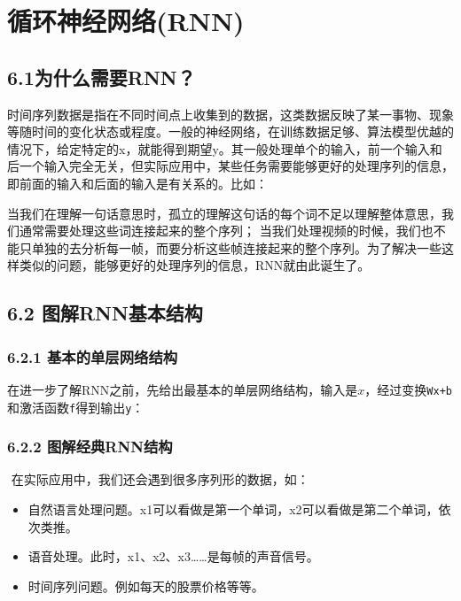 \chapter{循环神经网络(RNN)}\label{ux7b2cux516dux7ae0-ux5faaux73afux795eux7ecfux7f51ux7edcrnn}

\section{6.1为什么需要RNN？}\label{ux4e3aux4ec0ux4e48ux9700ux8981rnn}

​
时间序列数据是指在不同时间点上收集到的数据，这类数据反映了某一事物、现象等随时间的变化状态或程度。一般的神经网络，在训练数据足够、算法模型优越的情况下，给定特定的x，就能得到期望y。其一般处理单个的输入，前一个输入和后一个输入完全无关，但实际应用中，某些任务需要能够更好的处理序列的信息，即前面的输入和后面的输入是有关系的。比如：

​
当我们在理解一句话意思时，孤立的理解这句话的每个词不足以理解整体意思，我们通常需要处理这些词连接起来的整个序列；
当我们处理视频的时候，我们也不能只单独的去分析每一帧，而要分析这些帧连接起来的整个序列。为了解决一些这样类似的问题，能够更好的处理序列的信息，RNN就由此诞生了。

\section{6.2
图解RNN基本结构}\label{ux56feux89e3rnnux57faux672cux7ed3ux6784}

\subsection{6.2.1
基本的单层网络结构}\label{ux57faux672cux7684ux5355ux5c42ux7f51ux7edcux7ed3ux6784}

​
在进一步了解RNN之前，先给出最基本的单层网络结构，输入是\texttt{$x$}，经过变换\texttt{Wx+b}和激活函数\texttt{f}得到输出\texttt{y}：


\subsection{6.2.2
图解经典RNN结构}\label{ux56feux89e3ux7ecfux5178rnnux7ed3ux6784}

​ 在实际应用中，我们还会遇到很多序列形的数据，如：

\begin{itemize}
\item
  自然语言处理问题。x1可以看做是第一个单词，x2可以看做是第二个单词，依次类推。
\item
  语音处理。此时，x1、x2、x3\ldots{}\ldots{}是每帧的声音信号。
\item
  时间序列问题。例如每天的股票价格等等。
\end{itemize}

